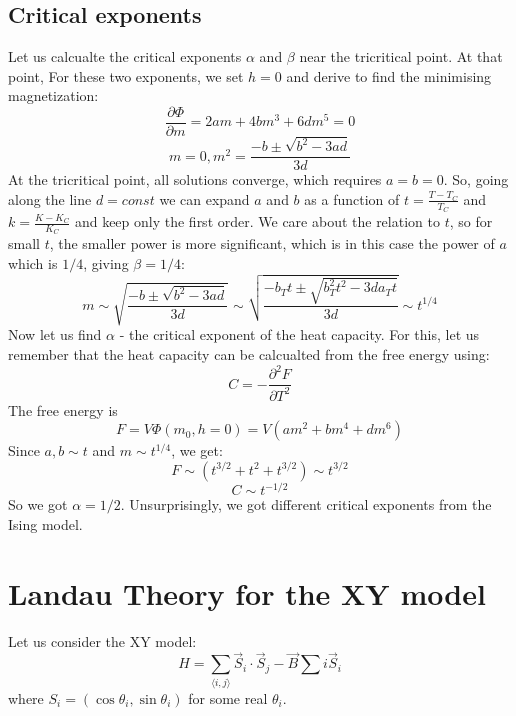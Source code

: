 \documentclass{article}
\begin{document}
\subsection{Critical exponents}
Let us calcualte the critical exponents $\alpha$ and $\beta$ near the tricritical point. At that point,  For these two exponents, we set $h = 0$ and derive to find the minimising magnetization:
\begin{equation}
    \frac{\partial \Phi}{\partial m} = 2am + 4bm^3 + 6dm^5 = 0
\end{equation}
\begin{equation}
    m = 0, m^2 = \frac{-b \pm \sqrt{b^2 - 3ad}}{3d}
\end{equation}
At the tricritical point, all solutions converge, which requires $a = b = 0$. So, going along the line $d = const$ we can expand $a$ and $b$ as a function of $t = \frac{T - T_C}{T_C}$ and $k = \frac{K - K_C}{K_C}$ and keep only the first order. We care about the relation to $t$, so for small $t$, the smaller power is more significant, which is in this case the power of $a$ which is $1/4$, giving $\beta = 1/4$:
\begin{equation}
    m \sim \sqrt{\frac{-b \pm \sqrt{b^2 - 3ad}}{3d}} \sim \sqrt{\frac{-b_T t \pm \sqrt{b_T^2t^2 - 3d a_Tt}}{3d}} \sim t^{1/4}
\end{equation}
Now let us find $\alpha$ - the critical exponent of the heat capacity. For this, let us remember that the heat capacity can be calcualted from the free energy using:
\begin{equation}
    C = -\frac{\partial^2 F}{\partial T^2}
\end{equation}
The free energy is
\begin{equation}
    F = V\Phi(m_0, h = 0) = V(am^2 + bm^4 + dm^6)
\end{equation}
Since $a, b \sim t$ and $m \sim t^{1/4}$, we get:
\begin{equation}
    F \sim (t^{3/2} + t^{2} + t^{3/2}) \sim t^{3/2}
\end{equation}
\begin{equation}
    C \sim t^{-1/2}
\end{equation}
So we got $\alpha = 1/2$. Unsurprisingly, we got different critical exponents from the Ising model.

\newpage
\section{Landau Theory for the XY model}
Let us consider the XY model:
\begin{equation}
    H = \sum_{\langle i, j \rangle} \vec{S}_i \cdot \vec{S}_j - \vec{B} \sum{i} \vec{S}_i
\end{equation}
where $S_i = \left(\cos\theta_i, \sin\theta_i\right)$ for some real $\theta_i$.
\end{document}
